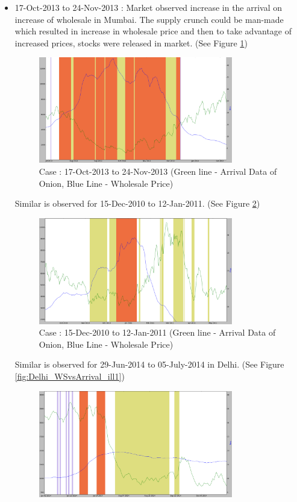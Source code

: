 \begin{itemize}
\item 17-Oct-2013 to 24-Nov-2013 : Market observed increase in the arrival on increase of wholesale in Mumbai. The supply crunch could be man-made which resulted in increase in wholesale price and then to take advantage of increased prices, stocks were released in market. (See Figure \ref{fig:Mumbai_WSvsArrival_ill1})
      \begin{figure}[H]
      \centering
      \includegraphics[width=0.8\textwidth]{graphs/Mumbai_WSvsArrival_ill1.png}
      \caption{Case : 17-Oct-2013 to 24-Nov-2013 (Green line - Arrival Data of Onion, Blue Line - Wholesale Price)}
      \label{fig:Mumbai_WSvsArrival_ill1}
      \end{figure}
Similar is observed for 15-Dec-2010 to 12-Jan-2011. (See Figure \ref{fig:Mumbai_WSvsArrival_ill2})
      \begin{figure}[H]
      \centering
      \includegraphics[width=0.8\textwidth]{graphs/Mumbai_WSvsArrival_ill2.png}
      \caption{Case : 15-Dec-2010 to 12-Jan-2011 (Green line - Arrival Data of Onion, Blue Line - Wholesale Price)}
      \label{fig:Mumbai_WSvsArrival_ill2}
      \end{figure}
Similar is observed for 29-Jun-2014 to 05-July-2014 in Delhi. (See Figure \ref{fig:Delhi_WSvsArrival_ill1})
      \begin{figure}[H]
      \centering
      \includegraphics[width=0.8\textwidth]{graphs/Delhi_WSvsArrival_ill1.png}

\end{figure}
\end{itemize}
